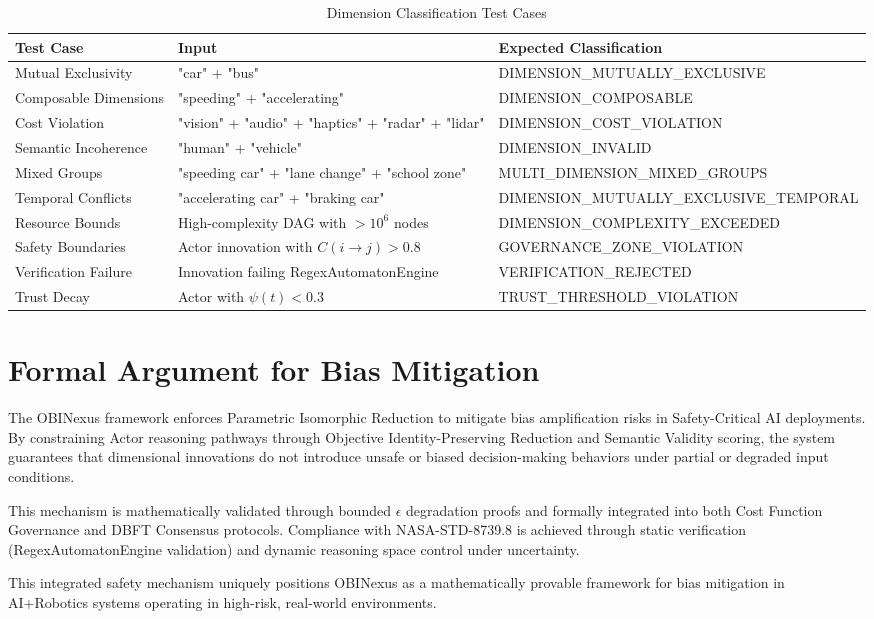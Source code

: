 \documentclass[12pt,a4paper]{article}
\begin{document}
\begin{appendices}
\begin{table}[H]
\centering
\caption{Dimension Classification Test Cases}
\begin{tabular}{|p{3cm}|p{4cm}|p{4cm}|}
\hline
\textbf{Test Case} & \textbf{Input} & \textbf{Expected Classification} \\
\hline
Mutual Exclusivity & "car" + "bus" & DIMENSION\_MUTUALLY\_EXCLUSIVE \\
\hline
Composable Dimensions & "speeding" + "accelerating" & DIMENSION\_COMPOSABLE \\
\hline
Cost Violation & "vision" + "audio" + "haptics" + "radar" + "lidar" & DIMENSION\_COST\_VIOLATION \\
\hline
Semantic Incoherence & "human" + "vehicle" & DIMENSION\_INVALID \\
\hline
Mixed Groups & "speeding car" + "lane change" + "school zone" & MULTI\_DIMENSION\_MIXED\_GROUPS \\
\hline
Temporal Conflicts & "accelerating car" + "braking car" & DIMENSION\_MUTUALLY\_EXCLUSIVE\_TEMPORAL \\
\hline
Resource Bounds & High-complexity DAG with $>10^6$ nodes & DIMENSION\_COMPLEXITY\_EXCEEDED \\
\hline
Safety Boundaries & Actor innovation with $C(i \rightarrow j) > 0.8$ & GOVERNANCE\_ZONE\_VIOLATION \\
\hline
Verification Failure & Innovation failing RegexAutomatonEngine & VERIFICATION\_REJECTED \\
\hline
Trust Decay & Actor with $\psi(t) < 0.3$ & TRUST\_THRESHOLD\_VIOLATION \\
\hline
\end{tabular}
\end{table}

\section{Formal Argument for Bias Mitigation}

The OBINexus framework enforces Parametric Isomorphic Reduction to mitigate bias amplification risks in Safety-Critical AI deployments. By constraining Actor reasoning pathways through Objective Identity-Preserving Reduction and Semantic Validity scoring, the system guarantees that dimensional innovations do not introduce unsafe or biased decision-making behaviors under partial or degraded input conditions.

This mechanism is mathematically validated through bounded $\epsilon$ degradation proofs and formally integrated into both Cost Function Governance and DBFT Consensus protocols. Compliance with NASA-STD-8739.8 is achieved through static verification (RegexAutomatonEngine validation) and dynamic reasoning space control under uncertainty.

This integrated safety mechanism uniquely positions OBINexus as a mathematically provable framework for bias mitigation in AI+Robotics systems operating in high-risk, real-world environments.

\end{appendices}
\end{document}
